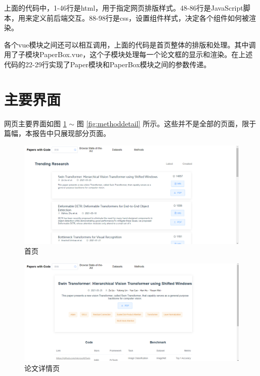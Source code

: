 上面的代码中，1-46行是html，用于指定网页排版样式。48-86行是JavaScript脚本，用来定义前后端交互。88-98行是css，设置组件样式，决定各个组件如何被渲染。

各个vue模块之间还可以相互调用，上面的代码是首页整体的排版和处理。其中调用了子模块PaperBox.vue，这个子模块处理每一个论文框的显示和渲染。在上述代码的22-29行实现了Paper模块和PaperBox模块之间的参数传递。

\section{主要界面}

网页主要界面如图 \ref{fig:main} $\sim$ 图 \ref{fig:methoddetail} 所示。这些并不是全部的页面，限于篇幅，本报告中只展现部分页面。

\begin{figure}[htbp!]
    \centering
    \includegraphics[width=\textwidth]{figures/main.png}
    \caption{首页}
    \label{fig:main}
\end{figure}

\begin{figure}[htbp!]
    \centering
    \includegraphics[width=\textwidth]{figures/paper.png}
    \caption{论文详情页}
    \label{fig:paper}
\end{figure}

